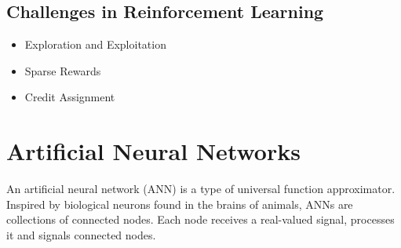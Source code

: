 

\subsection{Challenges in Reinforcement Learning}




\begin{itemize}
    \item Exploration and Exploitation
    \item Sparse Rewards
    \item Credit Assignment~\cite{minsky_cap_1961}
\end{itemize}


\section{Artificial Neural Networks}

An artificial neural network (ANN) is a type of universal function approximator.
Inspired by biological neurons found in the brains of animals, ANNs are collections of connected nodes.
Each node receives a real-valued signal, processes it and signals connected nodes.

